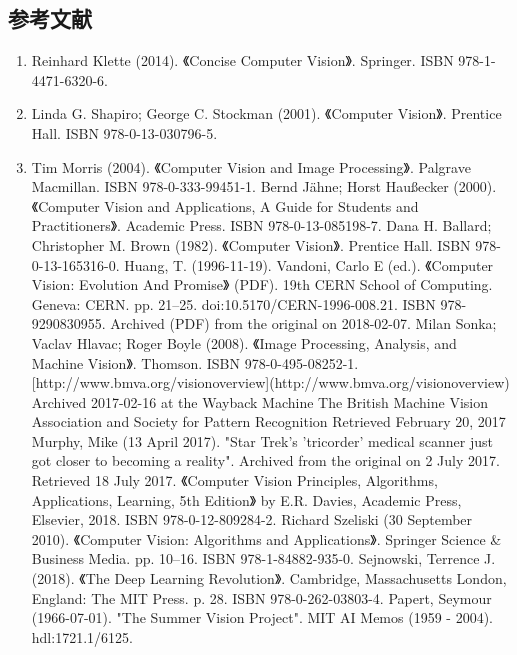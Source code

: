 \subsection{参考文献}  
\begin{enumerate}
\item Reinhard Klette (2014). 《Concise Computer Vision》. Springer. ISBN 978-1-4471-6320-6.  
\item Linda G. Shapiro; George C. Stockman (2001). 《Computer Vision》. Prentice Hall. ISBN 978-0-13-030796-5.  
\item Tim Morris (2004). 《Computer Vision and Image Processing》. Palgrave Macmillan. ISBN 978-0-333-99451-1.  
Bernd Jähne; Horst Haußecker (2000). 《Computer Vision and Applications, A Guide for Students and Practitioners》. Academic Press. ISBN 978-0-13-085198-7.  
Dana H. Ballard; Christopher M. Brown (1982). 《Computer Vision》. Prentice Hall. ISBN 978-0-13-165316-0.  
Huang, T. (1996-11-19). Vandoni, Carlo E (ed.). 《Computer Vision: Evolution And Promise》 (PDF). 19th CERN School of Computing. Geneva: CERN. pp. 21–25. doi:10.5170/CERN-1996-008.21. ISBN 978-9290830955. Archived (PDF) from the original on 2018-02-07.  
Milan Sonka; Vaclav Hlavac; Roger Boyle (2008). 《Image Processing, Analysis, and Machine Vision》. Thomson. ISBN 978-0-495-08252-1.  
[http://www.bmva.org/visionoverview](http://www.bmva.org/visionoverview) Archived 2017-02-16 at the Wayback Machine The British Machine Vision Association and Society for Pattern Recognition Retrieved February 20, 2017  
Murphy, Mike (13 April 2017). "Star Trek's 'tricorder' medical scanner just got closer to becoming a reality". Archived from the original on 2 July 2017. Retrieved 18 July 2017.  
《Computer Vision Principles, Algorithms, Applications, Learning, 5th Edition》 by E.R. Davies, Academic Press, Elsevier, 2018. ISBN 978-0-12-809284-2.  
Richard Szeliski (30 September 2010). 《Computer Vision: Algorithms and Applications》. Springer Science & Business Media. pp. 10–16. ISBN 978-1-84882-935-0.  
Sejnowski, Terrence J. (2018). 《The Deep Learning Revolution》. Cambridge, Massachusetts London, England: The MIT Press. p. 28. ISBN 978-0-262-03803-4.  
Papert, Seymour (1966-07-01). "The Summer Vision Project". MIT AI Memos (1959 - 2004). hdl:1721.1/6125.
\end{enumerate}